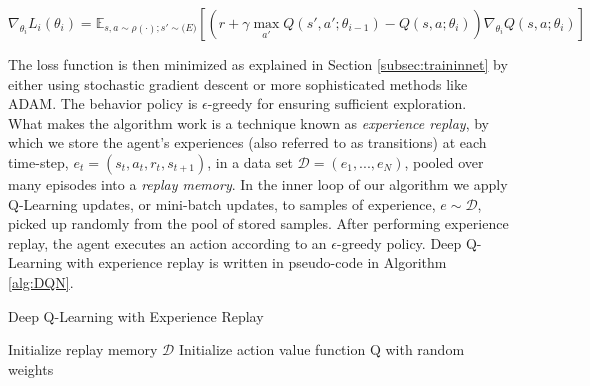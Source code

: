 \begin{equation}
	\nabla_{\theta_i}L_i (\theta_i) = \mathbb{E}_{s,a \sim \rho(\cdot); s' \sim \mathcal(E)} [(r + \gamma \max_{a'} Q (s', a'; \theta_{i-1}) -  Q(s,a; \theta_i)) \nabla_{\theta_i} Q(s,a; \theta_i)]
	\label{eq:gradientloss}
\end{equation}

The loss function is then minimized as explained in Section \ref{subsec:traininnet} by either using stochastic gradient descent or more sophisticated methods like ADAM. The behavior policy is $\epsilon$-greedy for ensuring sufficient exploration.
\\
\indent What makes the algorithm work is a technique known as \textit{experience replay}\cite{schaul2015prioritized}, by which we store the agent's experiences (also referred to as transitions) at each time-step, $e_t = (s_t, a_t, r_t, s_{t+1})$, in a data set $ \mathcal{D} = (e_1, ..., e_N)$, pooled over many episodes into a \textit{replay memory}. In the inner loop of our algorithm we apply Q-Learning updates, or mini-batch updates, to samples of experience, $e \sim \mathcal{D}$, picked up randomly from the pool of stored samples. After performing experience replay, the agent executes an action according to an $\epsilon$-greedy policy. Deep Q-Learning with experience replay is written in pseudo-code in Algorithm \ref{alg:DQN}.
\begin{algorithm}[h]
	\caption{Deep Q-Learning with Experience Replay}
	\label{alg:DQN}
	\SetAlgoLined
	\DontPrintSemicolon
	Initialize replay memory $\mathcal{D}$ \;
	Initialize action value function Q with random weights \;
\end{algorithm}
